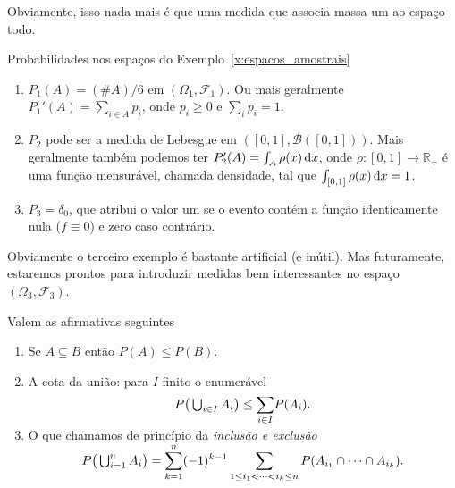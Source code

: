\documentclass[../main/Notas_de_aula.tex]{subfiles}
\begin{document}
Obviamente, isso nada mais é que uma medida que associa massa um ao espaço todo.

\begin{example} Probabilidades nos espaços do Exemplo~\ref{x:espacos_amostrais}
  \begin{enumerate}[\quad a)]
  \item $P_1(A) = (\#A)/6$ em $(\Omega_1, \mathcal{F}_1)$.
    Ou mais geralmente $P_1'(A) = \sum_{i \in A} p_i$, onde $p_i \geq 0$ e $\sum_i p_i = 1$.
  \item $P_2$ pode ser a medida de Lebesgue em $([0,1], \mathcal{B}([0,1]))$.
    Mais geralmente também podemos ter $P_2'(A) = \int_A \rho(x) \mathop{}\!\mathrm{d} x$, onde $\rho:[0,1] \to \mathbb{R}_+$ é uma função mensurável, chamada densidade, tal que $\int_{[0,1]} \rho (x) \mathop{}\!\mathrm{d} x = 1$.
  \item $P_3 = \delta_{0}$, que atribui o valor um se o evento contém a função identicamente nula ($f \equiv 0$) e zero caso contrário.
  \end{enumerate}
\end{example}
Obviamente o terceiro exemplo é bastante artificial (e inútil).
Mas futuramente, estaremos prontos para introduzir medidas bem interessantes no espaço $(\Omega_3, \mathcal{F}_3)$.

\begin{proposition}
  Valem as afirmativas seguintes
  \begin{enumerate}[\quad a)]
  \item Se $A \subseteq B$ então $P(A) \leq P(B)$.
  \item A cota da união: para $I$ finito o enumerável
    \begin{equation}
      P\big(\operatorname*{{\textstyle \bigcup}}\nolimits_{i\in I} A_i\big) \leq \smash{\sum\limits_{i\in I}} P(A_i).
    \end{equation}
  \item O que chamamos de princípio da \emph{inclusão e exclusão} 
    \begin{equation}
      P\big(\operatorname*{{\textstyle \bigcup}}\nolimits_{i=1}^{n} A_i\big) = \smash{\sum\limits_{k = 1}^n} (-1)^{k-1} \sum\limits_{1 \leq i_1 < \dots < i_k \leq n} P(A_{i_1} \cap \dots \cap A_{i_k}).
    \end{equation}
  \end{enumerate}
\end{proposition}
\end{document}
